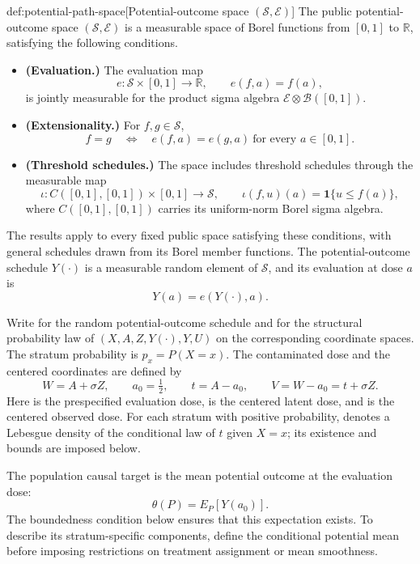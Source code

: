 \begin{definitionv}{def:potential-path-space}[Potential-outcome space \((\mathcal S,\mathcal E)\)]
The public potential-outcome space \((\mathcal S,\mathcal E)\) is a measurable space of Borel functions from \([0,1]\) to \(\mathbb R\), satisfying the following conditions.
\begin{itemize}
\item \textbf{(Evaluation.)} The evaluation map
\[
e:\mathcal S\times[0,1]\longrightarrow\mathbb R,
\qquad e(f,a)=f(a),
\]
is jointly measurable for the product sigma algebra \(\mathcal E\otimes\mathcal B([0,1])\).
\item \textbf{(Extensionality.)} For \(f,g\in\mathcal S\),
\[
f=g
\quad\Longleftrightarrow\quad
e(f,a)=e(g,a)\ \text{for every }a\in[0,1].
\]
\item \textbf{(Threshold schedules.)} The space includes threshold schedules through the measurable map
\[
\iota:C([0,1],[0,1])\times[0,1]\longrightarrow\mathcal S,
\qquad
\iota(f,u)(a)=\mathbf1\{u\le f(a)\},
\]
where \(C([0,1],[0,1])\) carries its uniform-norm Borel sigma algebra.
\end{itemize}
The results apply to every fixed public space satisfying these conditions, with general schedules drawn from its Borel member functions. The potential-outcome schedule \(Y(\cdot)\) is a measurable random element of \(\mathcal S\), and its evaluation at dose \(a\) is
\[
Y(a)=e(Y(\cdot),a).
\]
\end{definitionv}

Write  for the random potential-outcome schedule and  for the structural probability law of \((X,A,Z,Y(\cdot),Y,U)\) on the corresponding coordinate spaces. The stratum probability  is \(p_x=P(X=x)\). The contaminated dose  and the centered coordinates are defined by
\[
W=A+\sigma Z,
\qquad
a_0=\tfrac12,
\qquad
t=A-a_0,
\qquad
V=W-a_0=t+\sigma Z.
\]
Here  is the prespecified evaluation dose,  is the centered latent dose, and  is the centered observed dose. For each stratum with positive probability,  denotes a Lebesgue density of the conditional law of \(t\) given \(X=x\); its existence and bounds are imposed below.

The population causal target  is the mean potential outcome at the evaluation dose:
\[
\theta(P)=E_P[Y(a_0)].
\]
The boundedness condition below ensures that this expectation exists. To describe its stratum-specific components, define the conditional potential mean  before imposing restrictions on treatment assignment or mean smoothness.

